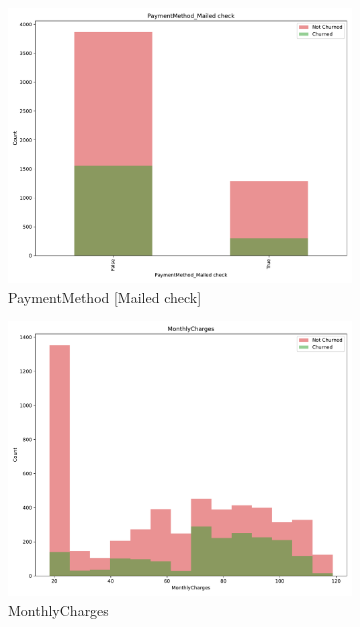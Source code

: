 \documentclass[a4paper,11pt]{article}
\begin{document}
\begin{landscape}
\begin{figure}
\begin{subfigure}{0.14\linewidth}
        \includegraphics[width=\linewidth]{figures/understanding/PaymentMethod_Mailed check.pdf}
        \caption{PaymentMethod [Mailed check]}
    \end{subfigure}
    \begin{subfigure}{0.14\linewidth}
        \includegraphics[width=\linewidth]{figures/understanding/MonthlyCharges.pdf}
        \caption{MonthlyCharges}
    \end{subfigure}
    \begin{subfigure}{0.14\linewidth}

\end{subfigure}
\end{figure}
\end{landscape}
\end{document}
